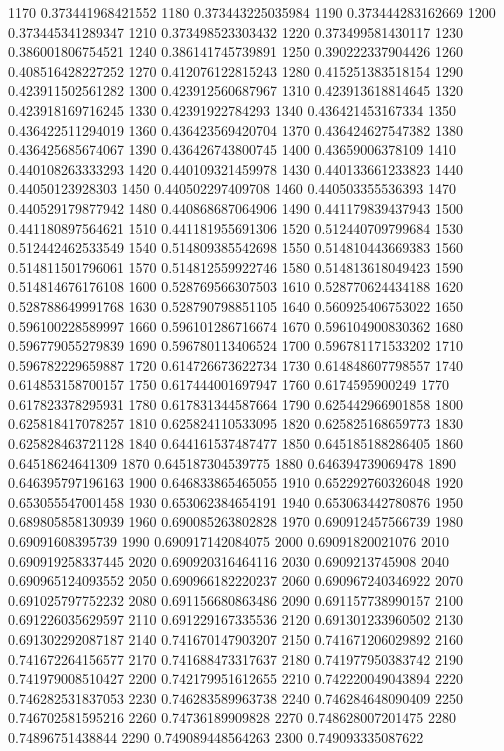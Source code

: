 {1170 0.373441968421552
1180 0.373443225035984
1190 0.373444283162669
1200 0.373445341289347
1210 0.373498523303432
1220 0.373499581430117
1230 0.386001806754521
1240 0.386141745739891
1250 0.390222337904426
1260 0.408516428227252
1270 0.412076122815243
1280 0.415251383518154
1290 0.423911502561282
1300 0.423912560687967
1310 0.423913618814645
1320 0.423918169716245
1330 0.42391922784293
1340 0.436421453167334
1350 0.436422511294019
1360 0.436423569420704
1370 0.436424627547382
1380 0.436425685674067
1390 0.436426743800745
1400 0.43659006378109
1410 0.440108263333293
1420 0.440109321459978
1430 0.440133661233823
1440 0.44050123928303
1450 0.440502297409708
1460 0.440503355536393
1470 0.440529179877942
1480 0.440868687064906
1490 0.441179839437943
1500 0.441180897564621
1510 0.441181955691306
1520 0.512440709799684
1530 0.512442462533549
1540 0.514809385542698
1550 0.514810443669383
1560 0.514811501796061
1570 0.514812559922746
1580 0.514813618049423
1590 0.514814676176108
1600 0.528769566307503
1610 0.528770624434188
1620 0.528788649991768
1630 0.528790798851105
1640 0.560925406753022
1650 0.596100228589997
1660 0.596101286716674
1670 0.596104900830362
1680 0.596779055279839
1690 0.596780113406524
1700 0.596781171533202
1710 0.596782229659887
1720 0.614726673622734
1730 0.614848607798557
1740 0.614853158700157
1750 0.617444001697947
1760 0.6174595900249
1770 0.617823378295931
1780 0.617831344587664
1790 0.625442966901858
1800 0.625818417078257
1810 0.625824110533095
1820 0.625825168659773
1830 0.625828463721128
1840 0.644161537487477
1850 0.645185188286405
1860 0.64518624641309
1870 0.645187304539775
1880 0.646394739069478
1890 0.646395797196163
1900 0.646833865465055
1910 0.652292760326048
1920 0.653055547001458
1930 0.653062384654191
1940 0.653063442780876
1950 0.689805858130939
1960 0.690085263802828
1970 0.690912457566739
1980 0.69091608395739
1990 0.690917142084075
2000 0.69091820021076
2010 0.690919258337445
2020 0.690920316464116
2030 0.6909213745908
2040 0.690965124093552
2050 0.690966182220237
2060 0.690967240346922
2070 0.691025797752232
2080 0.691156680863486
2090 0.691157738990157
2100 0.691226035629597
2110 0.691229167335536
2120 0.691301233960502
2130 0.691302292087187
2140 0.741670147903207
2150 0.741671206029892
2160 0.741672264156577
2170 0.741688473317637
2180 0.741977950383742
2190 0.741979008510427
2200 0.742179951612655
2210 0.742220049043894
2220 0.746282531837053
2230 0.746283589963738
2240 0.746284648090409
2250 0.746702581595216
2260 0.74736189909828
2270 0.748628007201475
2280 0.74896751438844
2290 0.749089448564263
2300 0.749093335087622
}
